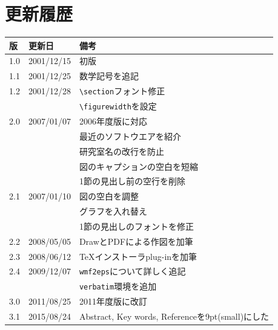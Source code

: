 \documentclass[onecolumn]{jsarticle}
\begin{document}
\section{更新履歴}
\begin{tabular}[t]{|l|l|l|} \hline
  版 & 更新日 & 備考 \\ \hline \hline
  1.0 & 2001/12/15 & 初版 \\ \hline
  1.1 & 2001/12/25 & 数学記号を追記 \\ \hline
  1.2 & 2001/12/28 & \verb+\section+フォント修正 \\
  & & \verb+\figurewidth+を設定 \\ \hline\hline
  2.0 & 2007/01/07 & 2006年度版に対応 \\
  & & 最近のソフトウエアを紹介 \\
  & & 研究室名の改行を防止 \\
  & & 図のキャプションの空白を短縮 \\
  & & 1節の見出し前の空行を削除 \\ \hline
  2.1 & 2007/01/10 & 図の空白を調整 \\
  & & グラフを入れ替え \\
  & & 1節の見出しのフォントを修正 \\ \hline
  2.2 & 2008/05/05 & DrawとPDFによる作図を加筆 \\ \hline
  2.3 & 2008/06/12 & TeXインストーラplug-inを加筆 \\ \hline
  2.4 & 2009/12/07 & \verb+wmf2eps+について詳しく追記 \\
  & & \verb+verbatim+環境を追加 \\ \hline\hline
  3.0 & 2011/08/25 & 2011年度版に改訂 \\ \hline
  3.1 & 2015/08/24 & Abstract, Key words, Referenceを9pt(small)にした \\ \hline
\end{tabular}
\end{document}
